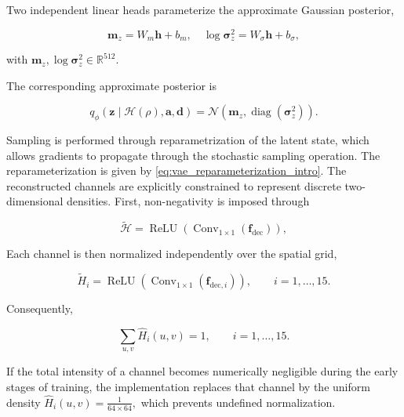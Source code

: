 Two independent linear heads parameterize the approximate Gaussian
posterior,

\[
    \boldsymbol{m}_{z}
    =
    W_{m}\mathbf{h}
    +
    b_{m}, \quad
    \log\boldsymbol{\sigma}_{z}^{2}
    =
    W_{\sigma}\mathbf{h}
    +
    b_{\sigma},
\]

with $ \boldsymbol{m}_{z}, \log\boldsymbol{\sigma}_{z}^{2} \in \mathbb{R}^{512} $.

The corresponding approximate posterior is

\begin{equation}
    q_{\phi}
    \left(
        \mathbf{z}
        \mid
        \mathcal{H}(\rho),
        \mathbf{a},
        \mathbf{d}
    \right)
    =
    \mathcal{N}
    \left(
        \boldsymbol{m}_{z},
        \operatorname{diag}
        \left(
            \boldsymbol{\sigma}_{z}^{2}
        \right)
    \right).
\end{equation}
    
Sampling is performed through reparametrization of the latent state, which allows gradients to propagate through the stochastic sampling operation. The reparameterization is given by \eqref{eq:vae_reparameterization_intro}. The reconstructed channels are explicitly constrained to represent discrete two-dimensional densities. First, non-negativity is imposed through

\begin{equation}
    \widetilde{\mathcal{H}}
    =
    \operatorname{ReLU}
    \left(
        \operatorname{Conv}_{1\times1}
        \left(
            \mathbf{f}_{\mathrm{dec}}
        \right)
    \right),
\end{equation}
   
Each channel is then normalized independently over the spatial grid,

\begin{equation}
    \widetilde{H}_i
    =
    \operatorname{ReLU}
    \left(
        \operatorname{Conv}_{1\times1}
        \left(
            \mathbf{f}_{\mathrm{dec},i}
        \right)
    \right),
    \qquad
    i=1,\ldots,15.
\end{equation}

Consequently,

\begin{equation}
    \sum_{u,v}
    \widehat{H}_i(u,v)
    =
    1,
    \qquad
    i=1,\ldots,15.
\end{equation}
    

If the total intensity of a channel becomes numerically negligible during the early stages of training, the implementation replaces that channel by the uniform density \(
    \widehat{H}_i(u,v)
    =
    \frac{1}{64\times64},
\) which prevents undefined normalization.

